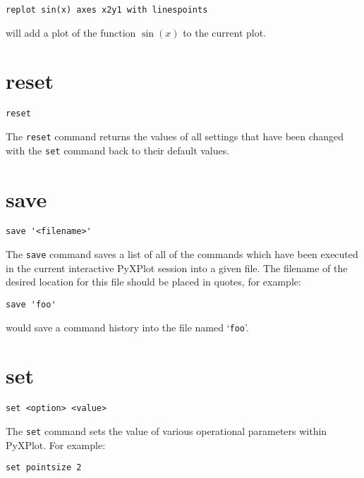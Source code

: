 \begin{verbatim}
replot sin(x) axes x2y1 with linespoints
\end{verbatim}

\noindent will add a plot of the function $\sin(x)$ to the current plot.

\section{reset}

\begin{verbatim}
reset
\end{verbatim}

The {\tt reset} command returns the values of all settings that have been
changed with the {\tt set} command back to their default values.


\section{save}

\begin{verbatim}
save '<filename>'
\end{verbatim}

The {\tt save} command saves a list of all of the commands which have been
executed in the current interactive PyXPlot session into a given file. The
filename of the desired location for this file should be placed in quotes, for
example:

\begin{verbatim}
save 'foo'
\end{verbatim}

\noindent would save a command history into the file named `{\tt foo}'.


\section{set}

\begin{verbatim}
set <option> <value>
\end{verbatim}

The {\tt set} command sets the value of various operational parameters within
PyXPlot.  For example:

\begin{verbatim}
set pointsize 2
\end{verbatim}


